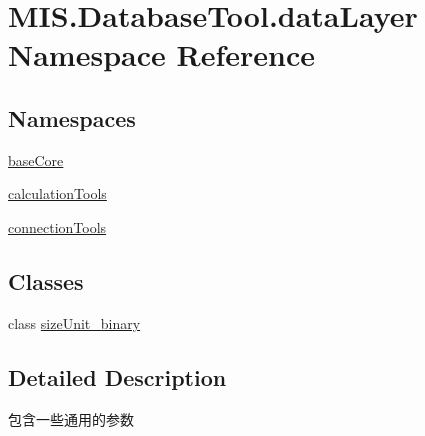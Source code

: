 \hypertarget{namespaceMIS_1_1DatabaseTool_1_1dataLayer}{}\section{M\+I\+S.\+Database\+Tool.\+data\+Layer Namespace Reference}
\label{namespaceMIS_1_1DatabaseTool_1_1dataLayer}
\subsection*{Namespaces}
\begin{DoxyCompactItemize}
\item 
 \hyperlink{namespaceMIS_1_1DatabaseTool_1_1dataLayer_1_1baseCore}{base\+Core}
\item 
 \hyperlink{namespaceMIS_1_1DatabaseTool_1_1dataLayer_1_1calculationTools}{calculation\+Tools}
\item 
 \hyperlink{namespaceMIS_1_1DatabaseTool_1_1dataLayer_1_1connectionTools}{connection\+Tools}
\end{DoxyCompactItemize}
\subsection*{Classes}
\begin{DoxyCompactItemize}
\item 
class \hyperlink{classMIS_1_1DatabaseTool_1_1dataLayer_1_1sizeUnit__binary}{size\+Unit\+\_\+binary}
\end{DoxyCompactItemize}


\subsection{Detailed Description}
\begin{DoxyVerb}包含一些通用的参数
\end{DoxyVerb}
 